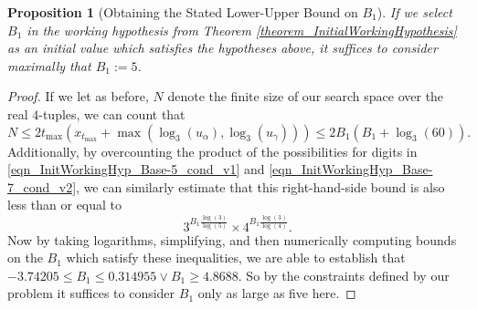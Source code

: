 \documentclass[12pt]{article}
\newtheorem{prop}[theorem]{Proposition}
\begin{document}
\begin{prop}[Obtaining the Stated Lower-Upper Bound on $B_1$] 
\label{prop_LowerUpperBoundOnB1} 
If we select $B_1$ in the working hypothesis from Theorem \ref{theorem_InitialWorkingHypothesis} 
as an initial value which 
satisfies the hypotheses above, it suffices to consider maximally that $B_1 := 5$. 
\end{prop} 
\begin{proof} 
If we let as before, $N$ denote the finite size of our search space over the real $4$-tuples, we can 
count that 
$$N \leq 2 t_{\max} (x_{t_{\max}} + \max(\log_3(u_{\alpha}), \log_3(u_{\gamma}))) \leq 
     2 B_1(B_1 + \log_3(60)).$$ 
Additionally, by overcounting the product of the possibilities for digits in 
\eqref{eqn_InitWorkingHyp_Base-5_cond_v1} and \eqref{eqn_InitWorkingHyp_Base-7_cond_v2}, 
we can similarly estimate that this right-hand-side bound is also less than or 
equal to $$3^{B_1 \frac{\log(3)}{\log(5)}} \times 4^{B_1 \frac{\log(3)}{\log(4)}}.$$ 
Now by taking logarithms, simplifying, and then numerically computing bounds on the $B_1$ which 
satisfy these inequalities, we are able to establish that 
$-3.74205 \leq B_1 \leq 0.314955 \vee B_1 \geq 4.8688$. So by the constraints defined by our problem it 
suffices to consider $B_1$ only as large as five here. 
\end{proof} 
\end{document}
